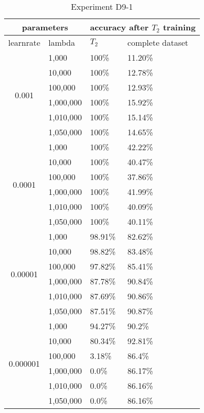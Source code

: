 \begin{table}[H]
    \centering
    \begin{tabular}{ |c|l|l|l|  }
        \hline
        \multicolumn{2}{|c|}{parameters} & \multicolumn{2}{c|}{accuracy after $T_2$ training} \\
        \hline
        learnrate & lambda & $T_2$ & complete dataset\\
        \hline
        \hline
        \multirow{6}{*}{0.001} & 1,000 & 100\% & 11.20\%\\
                            & 10,000 & 100\% & 12.78\%\\
                            & 100,000 & 100\% & 12.93\% \\
                            & 1,000,000 & 100\% & 15.92\% \\
                            & 1,010,000 & 100\% & 15.14\% \\
                            & 1,050,000 & 100\% & 14.65\% \\
        \hline
        \multirow{6}{*}{0.0001} & 1,000 & 100\% & 42.22\%\\
                                & 10,000 & 100\% & 40.47\%\\
                                & 100,000 & 100\% & 37.86\% \\
                                & 1,000,000 & 100\% & 41.99\% \\
                                & 1,010,000 & 100\% & 40.09\% \\
                                & 1,050,000 & 100\% & 40.11\% \\
        \hline
        \multirow{6}{*}{0.00001} & 1,000 & 98.91\% & 82.62\%\\
                                & 10,000 & 98.82\% & 83.48\%\\
                                & 100,000 & 97.82\% & 85.41\% \\
                                & 1,000,000 & 87.78\% & 90.84\% \\
                                & 1,010,000 & 87.69\% & 90.86\% \\
                                & 1,050,000 & 87.51\% & 90.87\% \\
        \hline
        \multirow{6}{*}{0.000001} & 1,000 & 94.27\% & 90.2\% \\
                                & 10,000 & 80.34\% & 92.81\% \\
                                & 100,000 & 3.18\% & 86.4\% \\
                                & 1,000,000 & 0.0\% & 86.17\% \\
                                & 1,010,000 & 0.0\% & 86.16\% \\
                                & 1,050,000 & 0.0\% & 86.16\% \\
        \hline
    \end{tabular}
    \caption{Experiment D9-1}
    \label{table:exp_d9-1}
\end{table}

